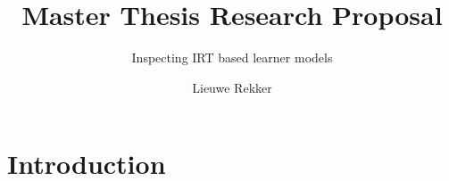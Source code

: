 \documentclass{scrartcl}
\begin{document}
\title{Master Thesis Research Proposal}
\subtitle{Inspecting IRT based learner models}
\author{Lieuwe Rekker}
\maketitle
\nocite{labelcombi}
\nocite{lftransfer}
\nocite{importance}
\nocite{knowledgeproblem}
\nocite{modelreview}
\nocite{eirt}
\nocite{pfa}
\nocite{ktpfa}
\nocite{skillcombi}
\nocite{lfa}
\nocite{blackart}
\nocite{hambleton}


\section{Introduction}
\begin{comment}
Many current intelligent tutor systems (ITS) use learner models that can give indications of to what extent a student has mastered a particular skill and even how fast students learn. The quality of these models is generally measured by how well these models predict 'one question into the future' performance, which is what these algorithms are made to maximize. Parameter values from these models are also inspected and stated to represent students' knowledge levels, how fast students learn, how difficult questions are etc. It would thus be wise to inspect other factors beyond the accuracy of the model to gain some idea of under what conditions they actually convey some stable real world factor or are rather part of a more black-box like model that performs well on its prediction task, but whose parameters are otherwise meaningless. \cite{knowledgeproblem} shows that this is indeed a problem: widely differing parameter settings can yield similar, (near) optimal performances. This proposal proposes research to explore if parameters of learner models hold meaning in real life.

The approach of this research is from the perspective that models resemble reality, but are necessarily not precise mirrors of it. Initially generated data will be used to see how well parameter values can be retrieved at all and to see what happens to parameters when there is a mismatch between model and 'reality' (i.e. training a model on data generated by a different model). The amount of training data will be looked at especially, since even if stable parameter values can be found, this will probably break down at some point. In the case of real data, original parameters and models are unknown. Over multiple training runs on different data-sets, variation in parameter values can be inspected. High variation here indicates that (despite possible good prediction performance of the model as a whole) the parameter does not represent anything in reality.
\end{comment}
\end{document}
